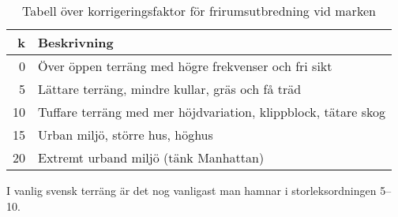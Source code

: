 \begin{table}[h]
	\begin{centering}
		\begin{tabular}{r|l}
			\textbf{k} & \textbf{Beskrivning} \\ \hline
			0 & Över öppen terräng med högre frekvenser och fri sikt\\
			5 & Lättare terräng, mindre kullar, gräs och få träd \\
			10 & Tuffare terräng med mer höjdvariation, klippblock, tätare skog \\
			15 & Urban miljö, större hus, höghus \\
			20 & Extremt urband miljö (tänk Manhattan)\\
		\end{tabular}
	\end{centering}
	\label{tab:frirum-faktor}
	\caption{Tabell över korrigeringsfaktor för frirumsutbredning vid marken}
\end{table}

I vanlig svensk terräng är det nog vanligast man hamnar i storleksordningen
5--10.


